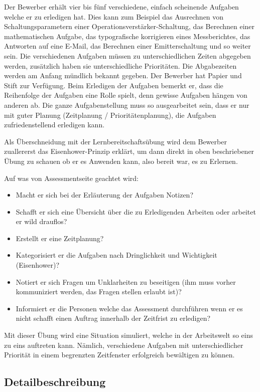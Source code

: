 Der Bewerber erhält vier bis fünf verschiedene, einfach scheinende Aufgaben welche er zu erledigen hat. Dies kann zum Beispiel das Ausrechnen von Schaltungsparametern einer Operationsverstärker-Schaltung, das Berechnen einer
mathematischen Aufgabe, das typografische korrigieren eines Messberichtes, das Antworten auf eine E-Mail, das Berechnen einer Emitterschaltung und so weiter sein. Die verschiedenen Aufgaben müssen zu unterschiedlichen Zeiten abgegeben werden, zusätzlich haben sie unterschiedliche Prioritäten. Die Abgabezeiten werden am Anfang mündlich bekannt gegeben. Der Bewerber hat Papier und Stift zur Verfügung.
Beim Erledigen der Aufgaben bemerkt er, dass die Reihenfolge der Aufgaben eine Rolle spielt, denn gewisse Aufgaben hängen von anderen ab. Die ganze Aufgabenstellung muss so ausgearbeitet sein, dass er nur mit
guter Planung (Zeitplanung / Prioritätenplanung), die Aufgaben zufriedenstellend erledigen kann.

Als Überschneidung mit der Lernbereitschaftsübung wird dem Bewerber zuallererst das Eisenhower-Prinzip erklärt, um dann direkt in oben beschriebener Übung zu schauen ob er es Anwenden kann, also bereit war, es zu Erlernen. 

Auf was von Assessmentseite geachtet wird:
\begin{itemize}
\item Macht er sich bei der Erläuterung der Aufgaben Notizen?
\item Schafft er sich eine Übersicht über die zu Erledigenden Arbeiten oder arbeitet er wild drauflos?
\item Erstellt er eine Zeitplanung?
\item Kategorisiert er die Aufgaben nach Dringlichkeit und Wichtigkeit (Eisenhower)?
\item Notiert er sich Fragen um Unklarheiten zu beseitigen (ihm muss vorher kommuniziert werden, das Fragen stellen erlaubt ist)?
\item Informiert er die Personen welche das Assessment durchführen wenn er es nicht schafft einen Auftrag innerhalb der Zeitfrist zu erledigen?
\end{itemize}

Mit dieser Übung wird eine Situation simuliert, welche in der Arbeitswelt so eins zu eins auftreten kann. Nämlich, verschiedene Aufgaben mit unterschiedlicher Priorität in einem begrenzten Zeitfenster erfolgreich bewältigen zu können.

\subsection{Detailbeschreibung}

